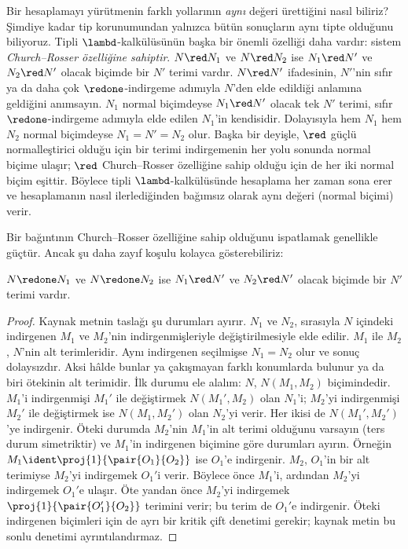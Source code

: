 \documentclass[../../../include/open-logic-section]{subfiles}
\begin{document}
Bir hesaplamayı yürütmenin farklı yollarının \emph{aynı} değeri ürettiğini
nasıl biliriz? Şimdiye kadar tip korunumundan yalnızca bütün sonuçların aynı
tipte olduğunu biliyoruz. Tipli $\lambd$-kalkülüsünün başka bir önemli
özelliği daha vardır: sistem \emph{Church--Rosser özelliğine sahiptir}.
$N \red N_1$ ve $N \red N_2$ ise $N_1 \red N'$ ve
$N_2 \red N'$ olacak biçimde bir $N'$ terimi vardır. $N \red N'$ ifadesinin,
$N'$'nin sıfır ya da daha çok $\redone$-indirgeme adımıyla $N$'den elde
edildiği anlamına geldiğini anımsayın. $N_1$ normal biçimdeyse $N_1 \red N'$
olacak tek $N'$ terimi, sıfır $\redone$-indirgeme adımıyla elde edilen
$N_1$'in kendisidir. Dolayısıyla hem $N_1$ hem $N_2$ normal biçimdeyse
$N_1=N'=N_2$ olur. Başka bir deyişle, $\red$ güçlü normalleştirici olduğu
için bir terimi indirgemenin her yolu sonunda normal biçime ulaşır;
$\red$ Church--Rosser özelliğine sahip olduğu için de her iki normal biçim
eşittir. Böylece tipli $\lambd$-kalkülüsünde hesaplama her zaman sona erer ve
hesaplamanın nasıl ilerlediğinden bağımsız olarak aynı değeri (normal biçimi)
verir.

Bir bağıntının Church--Rosser özelliğine sahip olduğunu ispatlamak genellikle
güçtür. Ancak şu daha
zayıf koşulu kolayca gösterebiliriz:

\begin{prop}
$N \redone N_1$ ve $N \redone N_2$ ise $N_1 \red N'$ ve $N_2 \red N'$
olacak biçimde bir $N'$ terimi vardır.
\end{prop}

\begin{proof}
  Kaynak metnin taslağı şu durumları ayırır. $N_1$ ve $N_2$, sırasıyla $N$
  içindeki indirgenen $M_1$ ve $M_2$'nin
  indirgenmişleriyle değiştirilmesiyle elde edilir. $M_1$ ile $M_2$, $N$'nin
  alt terimleridir. Aynı indirgenen seçilmişse $N_1=N_2$ olur ve sonuç
  dolaysızdır. Aksi hâlde bunlar ya çakışmayan farklı konumlarda bulunur ya
  da biri ötekinin alt terimidir. İlk durumu ele alalım: $N$, $N(M_1,M_2)$
  biçimindedir. $M_1$'i indirgenmişi $M_1'$ ile değiştirmek
  $N(M_1',M_2)$ olan $N_1$'i; $M_2$'yi indirgenmişi $M_2'$ ile değiştirmek
  ise $N(M_1,M_2')$ olan $N_2$'yi verir. Her ikisi de
  $N(M_1',M_2')$'ye indirgenir. Öteki durumda $M_2$'nin $M_1$'in alt terimi
  olduğunu varsayın (ters durum simetriktir) ve $M_1$'in indirgenen biçimine
  göre durumları ayırın. Örneğin
  $M_1 \ident \proj{1}{\pair{O_1}{O_2}}$ ise $O_1$'e indirgenir. $M_2$,
  $O_1$'in bir alt terimiyse $M_2$'yi indirgemek $O_1'$i verir. Böylece önce
  $M_1$'i, ardından $M_2$'yi indirgemek $O_1'$e ulaşır. Öte yandan önce
  $M_2$'yi indirgemek $\proj{1}{\pair{O_1'}{O_2}}$ terimini verir; bu terim
  de $O_1'$e indirgenir. Öteki indirgenen biçimleri için de ayrı bir kritik
  çift denetimi gerekir; kaynak metin bu sonlu denetimi ayrıntılandırmaz.
\end{proof}
\end{document}
